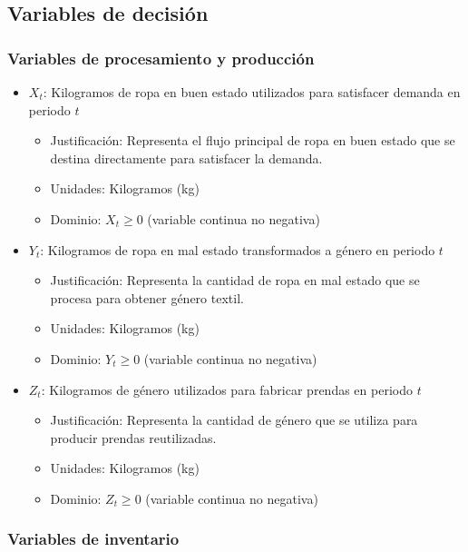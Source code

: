 \subsection*{Variables de decisión}

\subsubsection*{Variables de procesamiento y producción}

\begin{itemize}
    \item $X_{t}$: Kilogramos de ropa en buen estado utilizados para satisfacer demanda en periodo $t$
    \begin{itemize}
        \item Justificación: Representa el flujo principal de ropa en buen estado que se destina directamente para satisfacer la demanda.
        \item Unidades: Kilogramos (kg)
        \item Dominio: $X_t \geq 0$ (variable continua no negativa)
    \end{itemize}

    \item $Y_{t}$: Kilogramos de ropa en mal estado transformados a género en periodo $t$
    \begin{itemize}
        \item Justificación: Representa la cantidad de ropa en mal estado que se procesa para obtener género textil.
        \item Unidades: Kilogramos (kg)
        \item Dominio: $Y_t \geq 0$ (variable continua no negativa)
    \end{itemize}

    \item $Z_{t}$: Kilogramos de género utilizados para fabricar prendas en periodo $t$
    \begin{itemize}
        \item Justificación: Representa la cantidad de género que se utiliza para producir prendas reutilizadas.
        \item Unidades: Kilogramos (kg)
        \item Dominio: $Z_t \geq 0$ (variable continua no negativa)
    \end{itemize}
\end{itemize}

\subsubsection*{Variables de inventario}

